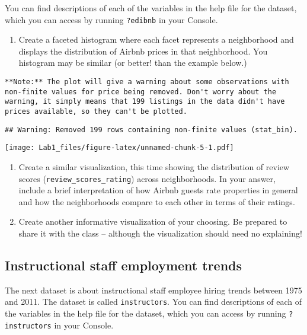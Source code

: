 \documentclass[
]{article}
\providecommand{\tightlist}{%
  \setlength{\itemsep}{0pt}\setlength{\parskip}{0pt}}
\begin{document}
You can find descriptions of each of the variables in the help file for
the dataset, which you can access by running \texttt{?edibnb} in your
Console.

\begin{enumerate}
\def\labelenumi{\arabic{enumi}.}
\setcounter{enumi}{2}
\tightlist
\item
  Create a faceted histogram where each facet represents a neighborhood
  and displays the distribution of Airbnb prices in that neighborhood.
  You histogram may be similar (or better! than the example below.)
\end{enumerate}

\begin{verbatim}
**Note:** The plot will give a warning about some observations with non-finite values for price being removed. Don't worry about the warning, it simply means that 199 listings in the data didn't have prices available, so they can't be plotted.
\end{verbatim}

\begin{verbatim}
## Warning: Removed 199 rows containing non-finite values (stat_bin).
\end{verbatim}

\texttt{[image: Lab1\_files/figure-latex/unnamed-chunk-5-1.pdf]}

\begin{enumerate}
\def\labelenumi{\arabic{enumi}.}
\setcounter{enumi}{3}
\item
  Create a similar visualization, this time showing the distribution of
  review scores (\texttt{review\_scores\_rating}) across neighborhoods.
  In your answer, include a brief interpretation of how Airbnb guests
  rate properties in general and how the neighborhoods compare to each
  other in terms of their ratings.
\item
  Create another informative visualization of your choosing. Be prepared
  to share it with the class -- although the visualization should need
  no explaining!
\end{enumerate}

\hypertarget{instructional-staff-employment-trends}{%
\subsection{Instructional staff employment
trends}\label{instructional-staff-employment-trends}}

The next dataset is about instructional staff employee hiring trends
between 1975 and 2011. The dataset is called \texttt{instructors}. You
can find descriptions of each of the variables in the help file for the
dataset, which you can access by running \texttt{?instructors} in your
Console.
\end{document}
